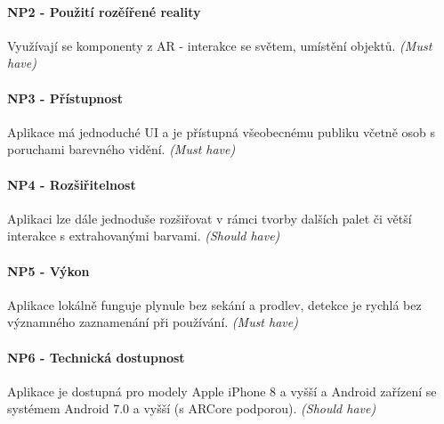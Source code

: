 \paragraph{NP2 - Použití rozěířené reality} Využívají se komponenty z AR - interakce se světem, umístění objektů. \emph{(Must have)} 
\paragraph{NP3 - Přístupnost} Aplikace má jednoduché UI a je přístupná všeobecnému publiku včetně osob s poruchami barevného vidění. \emph{(Must have)} 
\paragraph{NP4 - Rozšiřitelnost} Aplikaci lze dále jednoduše rozšiřovat v rámci tvorby dalších palet či větší interakce s extrahovanými barvami. \emph{(Should have)} 
\paragraph{NP5 - Výkon} Aplikace lokálně funguje plynule bez sekání a prodlev, detekce je rychlá bez významného zaznamenání při používání. \emph{(Must have)} 
\paragraph{NP6 - Technická dostupnost} Aplikace je dostupná pro modely Apple iPhone 8 a vyšší a Android zařízení se systémem Android 7.0 a vyšší (s ARCore podporou). \emph{(Should have)} 
